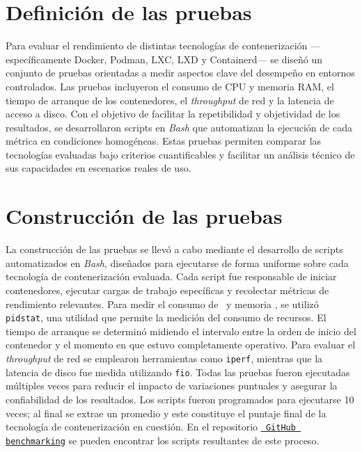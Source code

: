 \section{Definición de las pruebas}
\noindent
Para evaluar el rendimiento de distintas tecnologías de contenerización —específicamente Docker, Podman, LXC, LXD y Containerd— se diseñó un conjunto de pruebas orientadas a medir aspectos clave del desempeño en entornos controlados. Las pruebas incluyeron el consumo de CPU y memoria RAM, el tiempo de arranque de los contenedores, el \textit{throughput} de red y la latencia de acceso a disco. 
Con el objetivo de facilitar la repetibilidad y objetividad de los resultados, se desarrollaron scripts en \textit{Bash} que automatizan la ejecución de cada métrica en condiciones homogéneas. Estas pruebas permiten comparar las tecnologías evaluadas bajo criterios cuantificables y facilitar un análisis técnico de sus capacidades en escenarios reales de uso.

\section{Construcción de las pruebas}
\noindent
La construcción de las pruebas se llevó a cabo mediante el desarrollo de scripts automatizados en \textit{Bash}, diseñados para ejecutarse de forma uniforme sobre cada tecnología de contenerización evaluada. Cada script fue responsable de iniciar contenedores, ejecutar cargas de trabajo específicas y recolectar métricas de rendimiento relevantes.
Para medir el consumo de \CPU\ y memoria \RAM, se utilizó \texttt{pidstat}, una utilidad que permite la medición del consumo de recursos. El tiempo de arranque se determinó midiendo el intervalo entre la orden de inicio del contenedor y el momento en que estuvo completamente operativo. 
Para evaluar el \textit{throughput} de red se emplearon herramientas como \texttt{iperf}, mientras que la latencia de disco fue medida utilizando \texttt{fio}. Todas las pruebas fueron ejecutadas múltiples veces para reducir el impacto de variaciones puntuales y asegurar la confiabilidad de los resultados. Los scripts fueron programados para ejecutarse 10 veces; al final se extrae un promedio y este constituye el puntaje final de la tecnología de contenerización en cuestión.
En el repositorio \underline{\href{https://github.com/Anubis-1001/benchmark-tecnologias-de-contenerizacion} {\texttt{ GitHub benchmarking}}} se pueden encontrar los scripts resultantes de este proceso.

